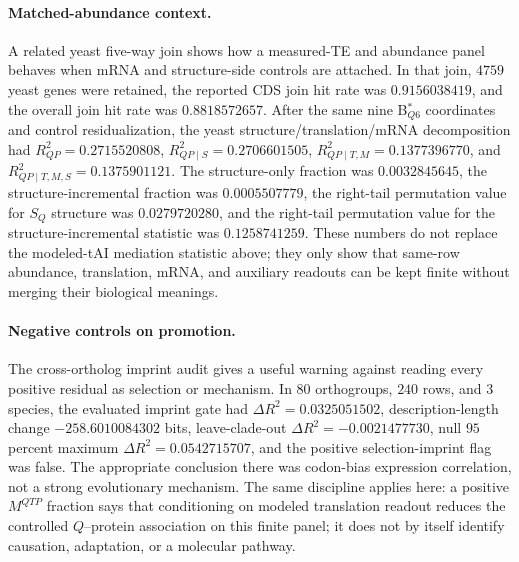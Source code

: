\paragraph{Matched-abundance context.}
A related yeast five-way join shows how a measured-TE and abundance panel behaves when mRNA and structure-side controls are attached.  In that join, $4759$ yeast genes were retained, the reported CDS join hit rate was $0.9156038419$, and the overall join hit rate was $0.8818572657$.  After the same nine B$^{\ast}_{Q6}$ coordinates and control residualization, the yeast structure/translation/mRNA decomposition had $R^2_{QP}=0.2715520808$, $R^2_{QP\mid S}=0.2706601505$, $R^2_{QP\mid T,M}=0.1377396770$, and $R^2_{QP\mid T,M,S}=0.1375901121$.  The structure-only fraction was $0.0032845645$, the structure-incremental fraction was $0.0005507779$, the right-tail permutation value for $S_Q$ structure was $0.0279720280$, and the right-tail permutation value for the structure-incremental statistic was $0.1258741259$.  These numbers do not replace the modeled-tAI mediation statistic above; they only show that same-row abundance, translation, mRNA, and auxiliary readouts can be kept finite without merging their biological meanings.

\paragraph{Negative controls on promotion.}
The cross-ortholog imprint audit gives a useful warning against reading every positive residual as selection or mechanism.  In $80$ orthogroups, $240$ rows, and $3$ species, the evaluated imprint gate had $\Delta R^2=0.0325051502$, description-length change $-258.6010084302$ bits, leave-clade-out $\Delta R^2=-0.0021477730$, null $95$ percent maximum $\Delta R^2=0.0542715707$, and the positive selection-imprint flag was false.  The appropriate conclusion there was codon-bias expression correlation, not a strong evolutionary mechanism.  The same discipline applies here: a positive $M^{QTP}$ fraction says that conditioning on modeled translation readout reduces the controlled $Q$--protein association on this finite panel; it does not by itself identify causation, adaptation, or a molecular pathway.

